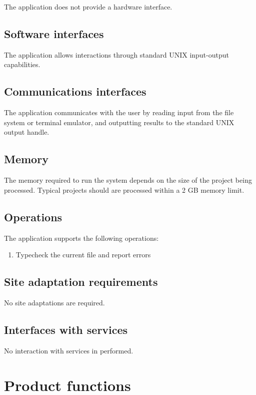 \documentclass[12pt]{article}
\newcounter{req}
\begin{document}
The application does not provide a hardware interface.

\subsection{Software interfaces}

The application allows interactions through standard UNIX input-output capabilities.

\subsection{Communications interfaces}

The application communicates with the user by reading input from the file system or terminal emulator, and outputting results to the standard UNIX output handle.

\subsection{Memory}

The memory required to run the system depends on the size of the project being processed. Typical projects should are processed within a 2 GB memory limit.

\subsection{Operations}

The application supports the following operations:

\begin{enumerate}
  \item Typecheck the current file and report errors
\end{enumerate}

\subsection{Site adaptation requirements}

No site adaptations are required.

\subsection{Interfaces with services}

No interaction with services in performed.

\section{Product functions}
\end{document}
